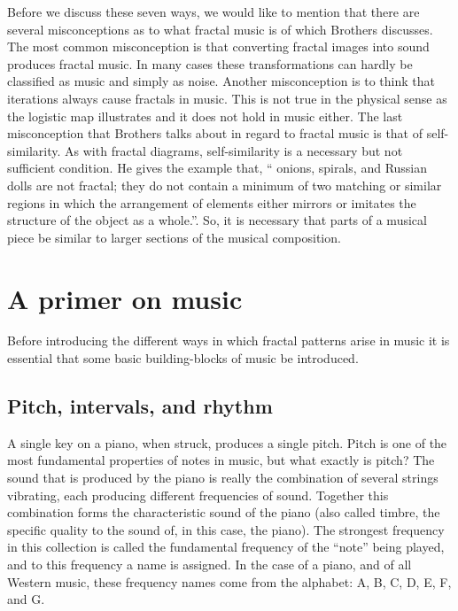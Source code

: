 \documentclass{article}
\begin{document}
Before we discuss these seven ways, we would like to mention that there are
several misconceptions as to what fractal music is of which Brothers discusses\cite{5}.
The most common misconception is that converting fractal images into sound
produces fractal music. In many cases these transformations can hardly be
classified as music and simply as noise. Another misconception is to think that
iterations always cause fractals in music. This is not true in the physical
sense as the logistic map illustrates\cite{5} and it does not hold in music either.
The last misconception that Brothers talks about in regard to fractal music is
that of self-similarity. As with fractal diagrams, self-similarity is a
necessary but not sufficient condition\cite{5}. He gives the example that, “ onions,
spirals, and Russian dolls are not fractal; they do not contain a minimum of two
matching or similar regions in which the arrangement of elements either mirrors
or imitates the structure of the object as a whole.”\cite{5}. So, it is necessary
that parts of a musical piece be similar to larger sections of the musical
composition.

\section{A primer on music}

Before introducing the different ways in which fractal patterns arise in music
it is essential that some basic building-blocks of music be introduced.

\subsection{Pitch, intervals, and rhythm}

A single key on a piano, when struck, produces a single pitch. Pitch is one of
the most fundamental properties of notes in music, but what exactly is pitch?
The sound that is produced by the piano is really the combination of several
strings vibrating, each producing different frequencies of sound. Together this
combination forms the characteristic sound of the piano (also called timbre, the
specific quality to the sound of, in this case, the piano). The strongest
frequency in this collection is called the fundamental frequency of the “note”
being played, and to this frequency a name is assigned. In the case of a piano,
and of all Western music, these frequency names come from the alphabet: A, B, C,
D, E, F, and G.
\end{document}
